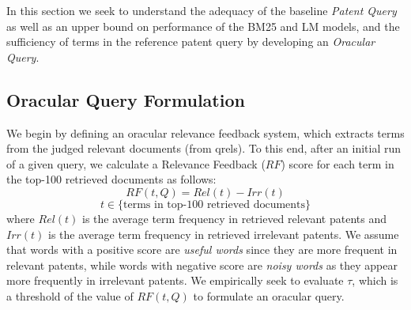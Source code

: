 %

In this section we seek to understand the adequacy of the baseline
\emph{Patent Query} as well as an upper bound on performance of the
BM25 and LM models, and the sufficiency of terms in the reference patent query 
by developing an \emph{Oracular Query}.

\subsection{Oracular Query Formulation}

We begin by defining an oracular relevance feedback system, which
extracts terms from the judged relevant documents (from qrels).  To this end, after an initial run of a given query, we
calculate a Relevance Feedback ($\mathit{RF}$) score for each term in the top-100
retrieved documents as follows:
\begin{equation}
RF(t,Q)=Rel(t)-Irr(t) 
 \label{eq:score}
\end{equation}\vspace*{-5ex}
\begin{displaymath}t\in \lbrace \mbox{terms in top-100 retrieved documents}\rbrace\end{displaymath}
where $ \mathit{Rel(t)} $ is the average term frequency in retrieved relevant patents and $ \mathit{Irr(t)} $ is the average term frequency in retrieved irrelevant patents. We assume that words with a positive score are \emph{ useful words} since they are more frequent in relevant patents, while words with negative score are \emph{ noisy words} as they appear more frequently in irrelevant patents. We empirically seek to evaluate $\tau$, which is a threshold of the value of $RF(t,Q)$ to formulate an oracular query.

